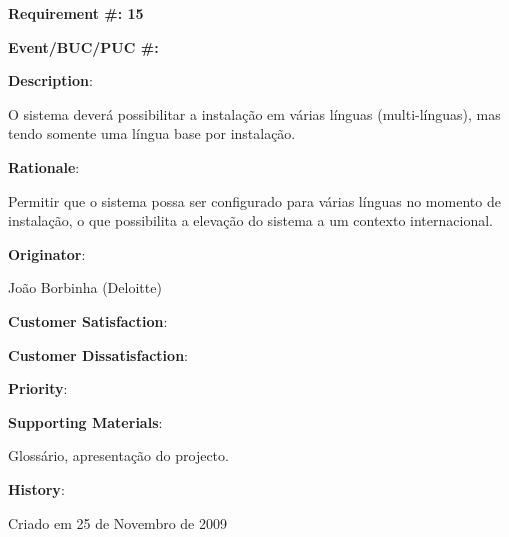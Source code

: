 \pagebreak

\begin{minipage}{0.55\textwidth}
\begin{flushleft}\textbf{Requirement \#: 15}\end{flushleft}
\end{minipage}
\begin{minipage}{0.4\textwidth}
\begin{flushright}\textbf{Event/BUC/PUC \#:}\end{flushright}
\end{minipage}

\begin{description}
\item \textbf{Description}:

O sistema deverá possibilitar a instalação em várias línguas (multi-línguas), mas tendo somente uma língua base por instalação.\\

\item \textbf{Rationale}:

Permitir que o sistema possa ser configurado para várias línguas no momento de instalação, o que possibilita a elevação do sistema a um contexto internacional.\\

\item \textbf{Originator}:

João Borbinha (Deloitte)\\

\begin{minipage}{0.45\textwidth}
\begin{flushleft}\item \textbf{Customer Satisfaction}:\end{flushleft}
\end{minipage}
\begin{minipage}{0.45\textwidth}
\begin{flushleft}\item \textbf{Customer Dissatisfaction}:\end{flushleft}
\end{minipage}

\item \textbf{Priority}:\\

\item \textbf{Supporting Materials}:

Glossário, apresentação do projecto.\\

\item \textbf{History}:

Criado em 25 de Novembro de 2009\\
\end{description}

